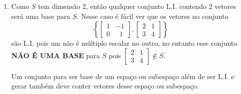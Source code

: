 \documentclass[12pt]{exam}
\begin{document}
\begin{enumerate}[label={\alph*})]
        \item Como $S$ tem dimensão 2, então qualquer conjunto L.I. contendo 2 vetores será uma base para $S$. Nesse caso é fácil ver que os vetores no conjunto
        \[
        \left\{
        \begin{bmatrix}
            1 & -1\\
            0 & \phantom{x} 1
        \end{bmatrix},
        \begin{bmatrix}
            2 & 1\\
            3 & 4
        \end{bmatrix}
        \right\}
        \]
        são L.I. pois um não é múltiplo escalar no outro, no entanto esse conjunto \textbf{NÃO É UMA BASE} para $S$ pois $ \begin{bmatrix}2 & 1\\3 & 4\end{bmatrix} \notin S$.

        Um conjunto para ser base de um espaço ou subespaço além de ser L.I. e gerar também deve conter vetores desse espaço ou subespaço.
    \end{enumerate}
\end{document}
